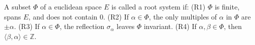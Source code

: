 A subset $\Phi$ of a euclidean space $E$ is called a root system if:
(R1) $\Phi$ is finite, spans $E$, and does not contain $0$.
(R2) If $\alpha \in \Phi$, the only multiples of $\alpha$ in $\Phi$ are $\pm \alpha$.
(R3) If $\alpha \in \Phi$, the reflection $\sigma_\alpha$ leaves $\Phi$ invariant.
(R4) If $\alpha, \beta \in \Phi$, then $\langle\beta, \alpha\rangle \in \mathbb{Z}$.
